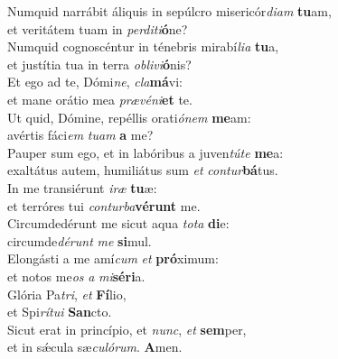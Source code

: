 \evenverse Numquid narrábit áliquis in sepúlcro misericór\textit{di}\textit{am} \textbf{tu}am,~\*\\
\evenverse et veritátem tuam in \textit{per}\textit{di}\textit{ti}\textbf{ó}ne?\\
\oddverse Numquid cognoscéntur in ténebris mirabí\textit{li}\textit{a} \textbf{tu}a,~\*\\
\oddverse et justítia tua in terra \textit{o}\textit{bli}\textit{vi}\textbf{ó}nis?\\
\evenverse Et ego ad te, Dómi\textit{ne}, \textit{cla}\textbf{má}vi:~\*\\
\evenverse et mane orátio mea \textit{præ}\textit{vé}\textit{ni}\textbf{et} te.\\
\oddverse Ut quid, Dómine, repéllis orati\textit{ó}\textit{nem} \textbf{me}am:~\*\\
\oddverse avértis fáci\textit{em} \textit{tu}\textit{am} \textbf{a} me?\\
\evenverse Pauper sum ego, et in labóribus a juven\textit{tú}\textit{te} \textbf{me}a:~\*\\
\evenverse exaltátus autem, humiliátus sum \textit{et} \textit{con}\textit{tur}\textbf{bá}tus.\\
\oddverse In me transiérunt \textit{i}\textit{ræ} \textbf{tu}æ:~\*\\
\oddverse et terróres tui \textit{con}\textit{tur}\textit{ba}\textbf{vé}\textbf{runt} me.\\
\evenverse Circumdedérunt me sicut aqua \textit{to}\textit{ta} \textbf{di}e:~\*\\
\evenverse circumde\textit{dé}\textit{runt} \textit{me} \textbf{si}mul.\\
\oddverse Elongásti a me amí\textit{cum} \textit{et} \textbf{pró}ximum:~\*\\
\oddverse et notos me\textit{os} \textit{a} \textit{mi}\textbf{sé}\textbf{ri}a.\\
\evenverse Glória Pa\textit{tri}, \textit{et} \textbf{Fí}lio,~\*\\
\evenverse et Spi\textit{rí}\textit{tu}\textit{i} \textbf{San}cto.\\
\oddverse Sicut erat in princípio, et \textit{nunc}, \textit{et} \textbf{sem}per,~\*\\
\oddverse et in sǽcula sæ\textit{cu}\textit{ló}\textit{rum}. \textbf{A}men.\\
